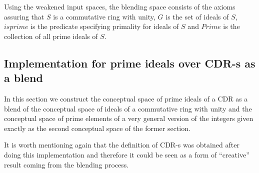 
Using the weakened input spaces, the blending space consists of the
axioms assuring that $S$ is a commutative ring with unity, $G$ is the
set of ideals of $S$, $isprime$ is the predicate specifying primality
for ideals of $S$ and $Prime$ is the collection of all prime ideals of
$S$.


\subsection{Implementation for prime ideals over CDR-s as a blend}\label{implementation}




In this section we construct the conceptual space of prime ideals of
a CDR as a blend of the conceptual space of ideals
of a commutative ring with unity and the conceptual space of prime
elements of a very general version of the integers given exactly as
the second conceptual space of the former section.

It is worth mentioning again that the definition of CDR-s was obtained after
doing this implementation and therefore it could be seen as a form of
``creative'' result coming from the blending process.


